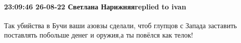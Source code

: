  
 
 
 
 

\paragraph{23:09:46 26-08-22 Светлана Нарижняяreplied to ivan}

Так убийства в Бучи ваши азовзы сделали, чтоб глупцов с Запада заставить
поставлять побольше денег и оружия,а ты повёлся как телок!🤣
